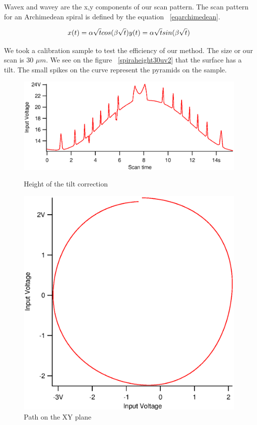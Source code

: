 Wavex and wavey are the x,y components of our scan pattern. The scan pattern for an Archimedean spiral is defined by the equation  ~\ref{eqarchimedean}.

\begin{equation}\label{eqarchimedean}
x(t)= \alpha \sqrt{t} cos(\beta \sqrt{t})\\
y(t)= \alpha \sqrt{t} sin(\beta \sqrt{t})
\end{equation}

We took a calibration sample to test the efficiency of our method. The size or our scan is 30 $\mu m$. We see on the figure  ~\ref{spiraheight30uv2} that the surface has a tilt. The small spikes on the curve represent the pyramids on the sample.

\begin{figure}[ht]
\begin{minipage}[b]{0.45\linewidth}
\centering
\includegraphics[width=\textwidth]{images/spiraheight30uv2.eps}
\caption{Height of the tilt correction}
\label{spiraheight30uv2}
\end{minipage}
\hspace{0.5cm}
\begin{minipage}[b]{0.45\linewidth}
\centering
\includegraphics[width=\textwidth]{images/xsenvsysen30u.eps}
\caption{Path on the XY plane}
\label{xsenvsysen30u}
\end{minipage}
\end{figure}


